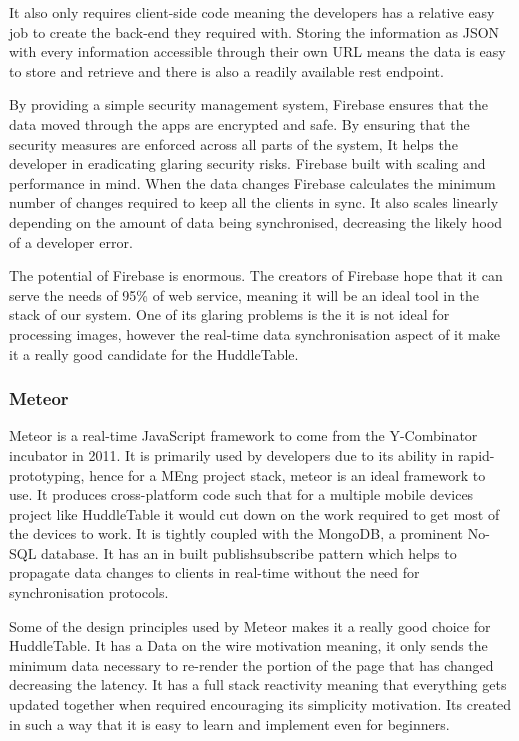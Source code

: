 It also only requires client-side code meaning the developers has
a relative easy job to create the back-end they required with. Storing
the information as JSON with every information accessible through
their own URL means the data is easy to store and retrieve and there
is also a readily available rest endpoint.
 
By providing a simple security management system, Firebase ensures
that the data moved through the apps are encrypted and safe. By ensuring
that the security measures are enforced across all parts of the system,
It helps the developer in eradicating glaring security risks. Firebase
built with scaling and performance in mind. When the data changes
Firebase calculates the minimum number of changes required to keep
all the clients in sync. It also scales linearly depending on the
amount of data being synchronised, decreasing the likely hood of a
developer error.
 
The potential of Firebase is enormous. The creators of Firebase hope
that it can serve the needs of 95\% of web service\cite{firebase-wired},
meaning it will be an ideal tool in the stack of our system. One of
its glaring problems is the it is not ideal for processing images,
however the real-time data synchronisation aspect of it make it a
really good candidate for the HuddleTable.
 
 
\subsubsection{Meteor}
 
Meteor\cite{meteor} is a real-time JavaScript framework to come from
the Y-Combinator incubator in 2011. It is primarily used by developers
due to its ability in rapid-prototyping, hence for a MEng project
stack, meteor is an ideal framework to use. It produces cross-platform
code such that for a multiple mobile devices project like HuddleTable
it would cut down on the work required to get most of the devices
to work. It is tightly coupled with the MongoDB, a prominent No-SQL
database. It has an in built publish\textendash subscribe pattern\cite{pub-sub-pattern}
which helps to propagate data changes to clients in real-time without
the need for synchronisation protocols.
 
Some of the design principles used by Meteor makes it a really good
choice for HuddleTable. It has a Data on the wire motivation meaning,
it only sends the minimum data necessary to re-render the portion
of the page that has changed decreasing the latency. It has a full
stack reactivity\cite{meteor-wiki} meaning that everything gets updated
together when required encouraging its simplicity motivation. Its
created in such a way that it is easy to learn and implement even
for beginners.
 
